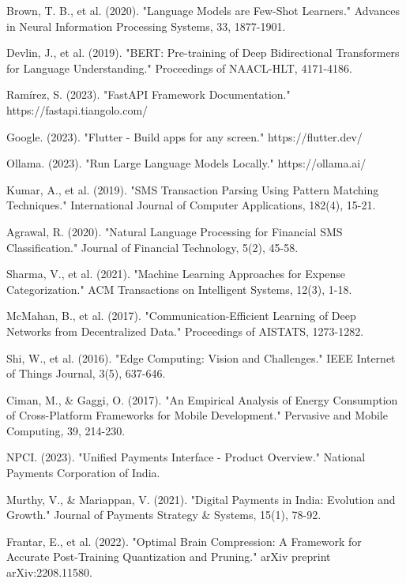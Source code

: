 \documentclass[11pt,a4paper]{report}
\begin{document}
\begin{itemize}
\begin{thebibliography}{99}
Brown, T. B., et al. (2020). "Language Models are Few-Shot Learners." Advances in Neural Information Processing Systems, 33, 1877-1901.

Devlin, J., et al. (2019). "BERT: Pre-training of Deep Bidirectional Transformers for Language Understanding." Proceedings of NAACL-HLT, 4171-4186.

Ramírez, S. (2023). "FastAPI Framework Documentation." https://fastapi.tiangolo.com/

Google. (2023). "Flutter - Build apps for any screen." https://flutter.dev/

Ollama. (2023). "Run Large Language Models Locally." https://ollama.ai/

Kumar, A., et al. (2019). "SMS Transaction Parsing Using Pattern Matching Techniques." International Journal of Computer Applications, 182(4), 15-21.

Agrawal, R. (2020). "Natural Language Processing for Financial SMS Classification." Journal of Financial Technology, 5(2), 45-58.

Sharma, V., et al. (2021). "Machine Learning Approaches for Expense Categorization." ACM Transactions on Intelligent Systems, 12(3), 1-18.

McMahan, B., et al. (2017). "Communication-Efficient Learning of Deep Networks from Decentralized Data." Proceedings of AISTATS, 1273-1282.

Shi, W., et al. (2016). "Edge Computing: Vision and Challenges." IEEE Internet of Things Journal, 3(5), 637-646.

Ciman, M., \& Gaggi, O. (2017). "An Empirical Analysis of Energy Consumption of Cross-Platform Frameworks for Mobile Development." Pervasive and Mobile Computing, 39, 214-230.

NPCI. (2023). "Unified Payments Interface - Product Overview." National Payments Corporation of India.

Murthy, V., \& Mariappan, V. (2021). "Digital Payments in India: Evolution and Growth." Journal of Payments Strategy \& Systems, 15(1), 78-92.

Frantar, E., et al. (2022). "Optimal Brain Compression: A Framework for Accurate Post-Training Quantization and Pruning." arXiv preprint arXiv:2208.11580.


\end{thebibliography}
\end{itemize}
\end{document}
